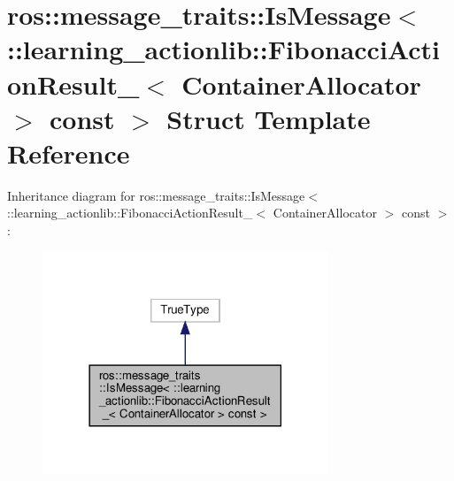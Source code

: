 \hypertarget{structros_1_1message__traits_1_1IsMessage_3_01_1_1learning__actionlib_1_1FibonacciActionResult__5304fc3985da8a3a9ca8a23c06921a67}{}\section{ros\+:\+:message\+\_\+traits\+:\+:Is\+Message$<$ \+:\+:learning\+\_\+actionlib\+:\+:Fibonacci\+Action\+Result\+\_\+$<$ Container\+Allocator $>$ const $>$ Struct Template Reference}
\label{structros_1_1message__traits_1_1IsMessage_3_01_1_1learning__actionlib_1_1FibonacciActionResult__5304fc3985da8a3a9ca8a23c06921a67}


Inheritance diagram for ros\+:\+:message\+\_\+traits\+:\+:Is\+Message$<$ \+:\+:learning\+\_\+actionlib\+:\+:Fibonacci\+Action\+Result\+\_\+$<$ Container\+Allocator $>$ const $>$\+:
\nopagebreak
\begin{figure}[H]
\begin{center}
\leavevmode
\includegraphics[width=242pt]{structros_1_1message__traits_1_1IsMessage_3_01_1_1learning__actionlib_1_1FibonacciActionResult__7c0d1a61e873f4e9f7b41a0a236d5baa}
\end{center}
\end{figure}


